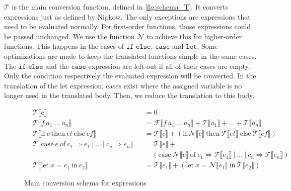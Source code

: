 $\mathcal{T}$ is the main conversion function, defined in \autoref{fig:schema_T}.
It converts expressions just as defined by Nipkow.
The only exceptions are expressions that need to be evaluated normally.
For first-order functions, those expressions could be passed unchanged.
We use the function $\mathcal{N}$ to achieve this for higher-order functions.
This happens in the cases of $\texttt{if-else}$, $\texttt{case}$ and $\texttt{let}$.
Some optimizations are made to keep the translated functions simple in the same cases.
The $\texttt{if-else}$ and the $\texttt{case}$ expression are left out if all of their cases are empty.
Only the condition respectively the evaluated expression will be converted.
In the translation of the let expression, cases exist where the assigned variable is no longer used in the translated body.
Then, we reduce the translation to this body.

\begin{figure}
\begin{align*}
  &\mathcal{T}\llbracket c\rrbracket &&= 0\\
  &\mathcal{T}\llbracket f\ a_{1}\ \dots\ a_{n}\rrbracket &&= \mathcal{F}\llbracket f\ a_{1}\ \dots\ a_{n}\rrbracket + \mathcal{T}\llbracket a_{1}\rrbracket + \dots + \mathcal{T}\llbracket a_{n}\rrbracket\\
  &\mathcal{T}\llbracket \text{if}\ c\ \text{then}\ et\ \text{else}\ ef\rrbracket &&= \mathcal{T}\llbracket c\rrbracket + (\text{if}\ \mathcal{N}\llbracket c\rrbracket\ \text{then}\ \mathcal{T}\llbracket et\rrbracket\ \text{else}\ \mathcal{T}\llbracket ef\rrbracket)\\
  &\mathcal{T}\llbracket \text{case}\ e\ \text{of}\ c_{1} \Rightarrow e_{1}\ |\ \dots\ |\ c_{n}\Rightarrow e_{n}\rrbracket &&= \mathcal{T}\llbracket e\rrbracket + \\
  & &&\ \ \ \ \ (\text{case}\ \mathcal{N}\llbracket e\rrbracket\ \text{of}\ c_{1}\Rightarrow\mathcal{T}\llbracket e_{1}\rrbracket\ |\ \dots\ |\ c_{n} \Rightarrow \mathcal{T}\llbracket e_{n}\rrbracket)\\
  &\mathcal{T}\llbracket \text{let}\ x = e_{1}\ \text{in}\ e_{2}\rrbracket &&= \mathcal{T}\llbracket e_{1}\rrbracket + (\text{let}\ x = \mathcal{N}\llbracket e_{1}\rrbracket\ \text{in}\ \mathcal{T}\llbracket e_{2}\rrbracket)
\end{align*}
  \caption{Main conversion schema for expressions}
  \label{fig:schema_T}
\end{figure}

